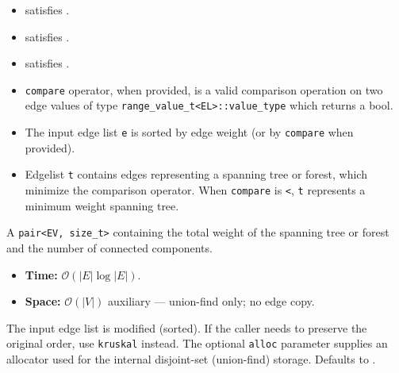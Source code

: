 {\small
      
}
\begin{itemdescr}
      \pnum\mandates
            \begin{itemize}
                  \item {} satisfies .
                  \item {} satisfies .
                  \item {} satisfies .
            \end{itemize}
      \pnum\preconditions
            \begin{itemize}
                  \item
                        \lstinline{compare} operator, when provided, is a valid comparison operation on two edge values
                        of type \lstinline{range_value_t<EL>::value_type} which returns a bool.
            \end{itemize}
      \pnum\effects 
            \begin{itemize}
                  \item
                        The input edge list \lstinline{e} is sorted by edge weight (or by \lstinline{compare}
                        when provided).
                  \item
                        Edgelist \lstinline{t} contains edges representing a spanning tree or forest, which
                        minimize the comparison operator.  When \lstinline{compare} is \lstinline{<},
                        \lstinline{t} represents a minimum weight spanning tree.
            \end{itemize}
      \pnum\returns A \lstinline{pair<EV, size_t>} containing the total weight of the spanning tree or
            forest and the number of connected components.
      \pnum\complexity
            \begin{itemize}
                  \item \textbf{Time:} $\mathcal{O}(|E|\log{|E|})$.
                  \item \textbf{Space:} $\mathcal{O}(|V|)$ auxiliary --- union-find only; no edge copy.
            \end{itemize}
      \pnum\remarks The input edge list is modified (sorted).  If the caller needs to
            preserve the original order, use \lstinline{kruskal} instead.
            The optional \lstinline{alloc} parameter supplies an allocator used for
            the internal disjoint-set (union-find) storage.  Defaults to
            .
\end{itemdescr}

